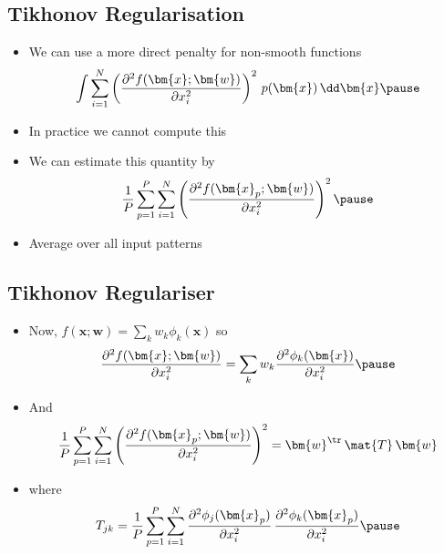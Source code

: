 \begin{slide}
\section[-1]{Tikhonov Regularisation}

\begin{PauseHighLight}

\begin{itemize}
\item We can use a more direct penalty for non-smooth functions
  \begin{displaymath}
    \int \sum_{i=1}^N \left(\frac{\partial^2 f(\bm{x};\bm{w})}{\partial
        x_i^2}\right)^2\, p(\bm{x}) \, \dd \bm{x}\pause
  \end{displaymath}
\item In practice we cannot compute this\pause
\item We can estimate this quantity by
  \begin{displaymath}
    \frac{1}{P} \sum_{p=1}^P \sum_{i=1}^N \left(\frac{\partial^2
        f(\bm{x}_p;\bm{w})}{\partial x_i^2}\right)^2\pause
  \end{displaymath}
\item Average over all input patterns\pause
\end{itemize}


\end{PauseHighLight}
\end{slide}


\begin{slide}
\section[-1]{Tikhonov Regulariser}

\begin{PauseHighLight}

\begin{itemize}
\item Now, $f(\bm{x};\bm{w}) = \sum_k w_k \phi_k(\bm{x})$ so
  \begin{displaymath}
    \frac{\partial^2 f(\bm{x};\bm{w})}{\partial x_i^2} =
    \sum_k w_k  \frac{\partial^2 \phi_k(\bm{x})}{\partial x_i^2}\pause
  \end{displaymath}
\item And
  \begin{displaymath}
     \frac{1}{P} \sum_{p=1}^P \sum_{i=1}^N \left(
      \frac{\partial^2 f(\bm{x}_p;\bm{w})}{\partial x_i^2}\right)^2
    = \bm{w}^\tr\, \mat{T}\, \bm{w}
  \end{displaymath}
\item where
  \begin{displaymath}
    T_{jk} = \frac{1}{P}  \sum_{p=1}^P \sum_{i=1}^N \frac{\partial^2
    \phi_j(\bm{x}_p)}{\partial 
    x_i^2} \, \frac{\partial^2 \phi_k(\bm{x}_p)}{\partial x_i^2}\pause
  \end{displaymath}
\end{itemize}

\end{PauseHighLight}
\end{slide}

